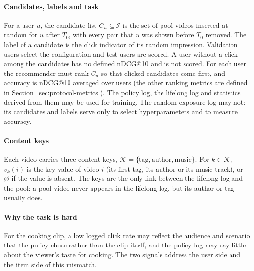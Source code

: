 \paragraph{Candidates, labels and task} For a user $u$, the candidate list $C_u\subseteq\mathcal I$ is the set of pool videos inserted
at random for $u$ after $T_0$, with every pair that $u$ was shown before $T_0$ removed. The label of a candidate is the click
indicator of its random impression. Validation users select the configuration and test users are scored. A user without a click among
the candidates has no defined nDCG@10 and is not scored. For each user the recommender must rank $C_u$ so that clicked candidates come
first, and accuracy is nDCG@10 averaged over users (the other ranking metrics are defined in Section~\ref{sec:protocol-metrics}). The policy log, the lifelong log and statistics derived from them may be used for
training. The random-exposure log may not: its candidates and labels serve only to select hyperparameters and to measure accuracy.

\paragraph{Content keys} Each video carries three content keys, $\mathcal K=\{\mathrm{tag},\mathrm{author},\mathrm{music}\}$. For
$k\in\mathcal K$, $v_k(i)$ is the key value of video $i$ (its first tag, its author or its music track), or $\varnothing$ if the value is
absent. The keys are the only link between the lifelong log and the pool: a pool video never appears in the lifelong log, but its
author or tag usually does.

\paragraph{Why the task is hard} For the cooking clip, a low logged click rate may reflect the audience and scenario that the policy
chose rather than the clip itself, and the policy log may say little about the viewer's taste for cooking. The two signals address
the user side and the item side of this mismatch.

